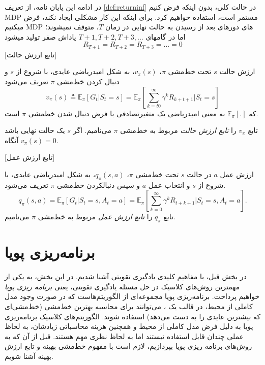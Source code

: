 در ادامه این پایان نامه، از تعریف 
\ref{def:returninf}
در حالت کلی، بدون اینکه فرض کنیم MDP مستمر است، استفاده خواهیم کرد. برای اینکه این کار مشکلی ایجاد نکند، فرض می\nf کنیم MDP های دوره\nf ای بعد از رسیدن به حالت نهایی در زمان $T$، متوقف نمی\nf شوند؛ اما در گام\nf های 
$T+1, T+2, T+3, ...$
پاداش صفر تولید می\nf شود
$$R_{T+1} = R_{T+2} = R_{T+3} = ... = 0$$
[تابع ارزش حالت]

 ارزش حالت  $s$ تحت خط‌مشی 
 $\pi$،
 $v_\pi(s)$،
  به شکل امیدریاضی عایدی، با شروع از $s$ و دنبال کردن خط‌مشی $\pi$ تعریف می‌شود
$$v_\pi(s) \triangleq \mathbb{E}_\pi\left[G_t| S_t=s\right] = \mathbb{E}_\pi\left[\sum_{k=t0}^{\infty} \gamma^{k} R_{k+t+1}|S_t =s \right]$$
که $\mathbb{E}_\pi[.]$
به معنی امیدریاضی  یک متغیرتصادفی با فرض دنبال شدن خط\nf مشی $\pi$ است.

تابع $v_\pi$ را 
\textit{تابع ارزش حالت} مربوط به خط‌مشی 
$\pi$
می‌نامیم. اگر $s$ یک حالت نهایی باشد آنگاه 
$v_\pi(s) = 0$.


\label{statevaluedef}

[تابع ارزش عمل]

ارزش عمل  $a$ در حالت
$s$
 تحت خط‌مشی 
$\pi$،
$q_\pi(s,a)$،
  به شکل امیدریاضی عایدی، با شروع از $s$ و انتخاب عمل $a$  و سپس دنبال\nf کردن خط‌مشی $\pi$ تعریف می‌شود.
$$q_\pi(s,a) = \mathbb{E}_\pi\left[G_t| S_t=s, A_t=a\right] = \mathbb{E}_\pi\left[\sum_{k=0}^{\infty} \gamma^k R_{t+k+1}|S_t =s, A_t=a \right].$$
تابع $q_\pi$ را 
\textit{تابع ارزش عمل}
 مربوط به خط‌مشی 
$\pi$
می‌نامیم.
\section{برنامه‌ریزی پویا}
در بخش قبل، با مفاهیم کلیدی یادگیری تقویتی آشنا شدیم. در این بخش، به یکی از مهم\nf ترین روش‌های کلاسیک در حل مسئله یادگیری تقویتی، یعنی 
\textit{برنامه ریزی پویا}
خواهیم پرداخت. برنامه‌ریزی پویا
 مجموعه‌ای از الگوریتم‌هاست  که در صورت وجود مدل کاملی از محیط، در قالب یک 
،
 می‌توانند برای محاسبه بهترین خط‌مشی (خط‌مشی‌ای که بیش\nf ترین عایدی را به دست می‌دهد) استفاده شوند.
الگوریتم‌های کلاسیک برنامه‌ریزی پویا به دلیل فرض
مدل کاملی از محیط و همچنین هزینه محاسباتی زیادشان، به لحاظ عملی چندان قابل استفاده نیستند اما به لحاظ نظری مهم هستند. قبل از آن که به روش‌های برنامه ریزی پویا بپردازیم، لازم است با مفهوم خط‌مشی بهینه و تابع ارزش بهینه آشنا شویم.
